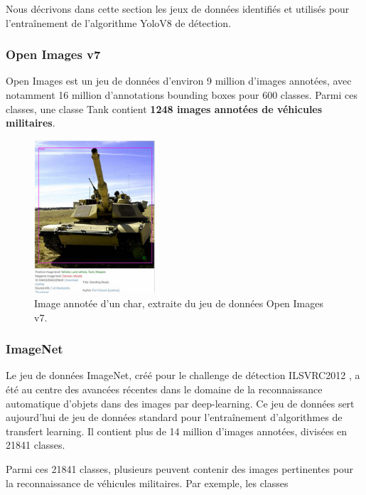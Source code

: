 Nous décrivons dans cette section les jeux de données identifiés et utilisés pour l’entraînement de l’algorithme YoloV8 de détection.

\subsubsection{Open Images v7}

Open Images \cite{openimages2024} est un jeu de données d’environ 9 million d’images annotées, avec notamment 16 million d’annotations bounding boxes pour 600 classes.
Parmi ces classes, une classe Tank contient \textbf{1248 images annotées de véhicules militaires}.

\begin{figure}[H]
    \center
    \includegraphics[width=0.4\textwidth]{./images/char-leclerc-openv7.png}
    \caption[Image annotée d’un char]{Image annotée d’un char, extraite du jeu de données Open Images v7.}\label{fig:image-annotée-char}
\end{figure}

\subsubsection{ImageNet}

Le jeu de données ImageNet, créé pour le challenge de détection ILSVRC2012 \cite{imagenet2012}, a été au centre des avancées récentes dans le domaine de la reconnaissance automatique d’objets dans des images par deep-learning.
Ce jeu de données sert aujourd’hui de jeu de données standard pour l’entraînement d’algorithmes de transfert learning.
Il contient plus de 14 million d’images annotées, divisées en 21841 classes.

Parmi ces 21841 classes, plusieurs peuvent contenir des images pertinentes pour la reconnaissance de véhicules militaires. Par exemple, les classes


